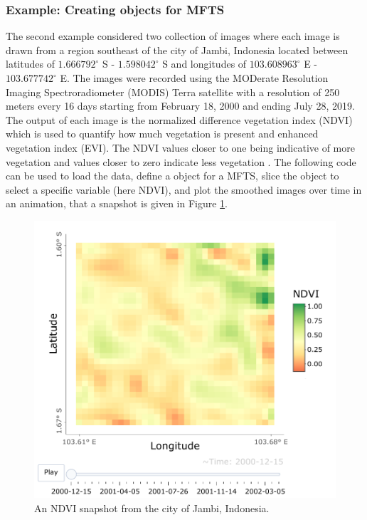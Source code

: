 \subsubsection{Example: Creating  objects for MFTS}
The second example considered two collection of images where each image is drawn from a region southeast of the city of Jambi, Indonesia located between latitudes of $1.666792^{\circ}$ S - $1.598042^{\circ}$ S and longitudes of $103.608963^{\circ}$ E - $103.677742^{\circ}$ E. The images were recorded using the MODerate Resolution Imaging Spectroradiometer (MODIS) Terra satellite with a resolution of 250 meters every 16 days starting from February 18, 2000 and ending July 28, 2019. The output of each image is the normalized difference vegetation index (NDVI) which is used to quantify how much vegetation is present and enhanced vegetation index (EVI). The NDVI values closer to one being indicative of more vegetation and values closer to zero indicate less vegetation \citep[see][for more details]{haghbin2021}. The following code can be used to load the data, define a  object for a MFTS, slice the  object to select a specific variable (here NDVI),  and plot the smoothed images over time in an animation, that a snapshot is given in Figure \ref{fig:ndvi_image}. 

\begin{figure}[b!]
	\centering
	\includegraphics[width=.67\textwidth]{figures/ndvi.pdf}
	\caption{An NDVI snapshot from the city of Jambi, Indonesia.}
	\label{fig:ndvi_image}
\end{figure}

